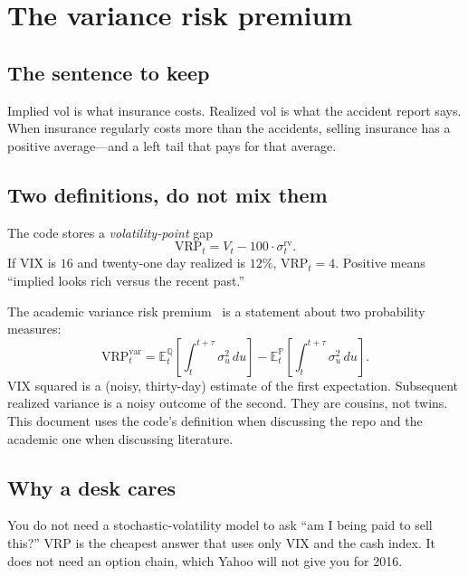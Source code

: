\documentclass[11pt,a4paper]{article}
\begin{document}
\section{The variance risk premium}
\label{ch:vrp}

\subsection{The sentence to keep}

Implied vol is what insurance costs. Realized vol is what the accident report says. When insurance regularly costs more than the accidents, selling insurance has a positive average---and a left tail that pays for that average.

\subsection{Two definitions, do not mix them}

The code stores a \emph{volatility-point} gap
\begin{equation}
  \mathrm{VRP}_t = V_t - 100\cdot\sigma^{\mathrm{rv}}_t.
\end{equation}
If VIX is $16$ and twenty-one day realized is $12\%$, $\mathrm{VRP}_t=4$. Positive means ``implied looks rich versus the recent past.''

The academic variance risk premium~\cite{carrwu2009,bollerslev2009} is a statement about two probability measures:
\begin{equation}
  \mathrm{VRP}^{\mathrm{var}}_t
  = \mathbb{E}^{\mathbb{Q}}_t\!\left[\int_t^{t+\tau} \sigma_u^2\,du\right]
  - \mathbb{E}^{\mathbb{P}}_t\!\left[\int_t^{t+\tau} \sigma_u^2\,du\right].
\end{equation}
VIX squared is a (noisy, thirty-day) estimate of the first expectation. Subsequent realized variance is a noisy outcome of the second. They are cousins, not twins. This document uses the code's definition when discussing the repo and the academic one when discussing literature.

\subsection{Why a desk cares}

You do not need a stochastic-volatility model to ask ``am I being paid to sell this?'' VRP is the cheapest answer that uses only VIX and the cash index. It does not need an option chain, which Yahoo will not give you for 2016.
\end{document}
